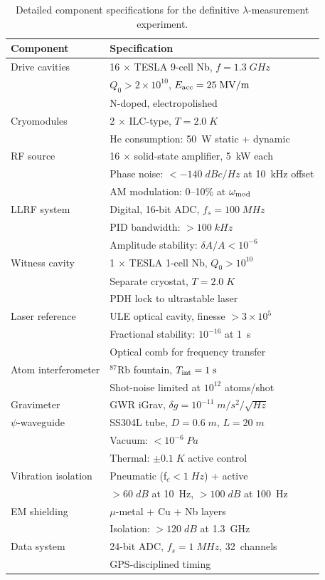 \documentclass[aps,prd,twocolumn,superscriptaddress,floatfix,nofootinbib]{revtex4-2}
\begin{document}
\begin{table}[h]
\caption{Detailed component specifications for the definitive
$\lambda$-measurement experiment.}
\label{tab:components}
\begin{ruledtabular}
\begin{tabular}{ll}
Component & Specification \\
\hline
Drive cavities & 16 $\times$ TESLA 9-cell Nb, $f = 1.3\;\si{GHz}$ \\
 & $Q_0 > 2\times10^{10}$, $E_{\rm acc} = 25\;\si{MV/m}$ \\
 & N-doped, electropolished \\
Cryomodules & 2 $\times$ ILC-type, $T = 2.0\;\si{K}$ \\
 & He consumption: 50~W static + dynamic \\
RF source & 16 $\times$ solid-state amplifier, 5~kW each \\
 & Phase noise: $< -140\;\si{dBc/Hz}$ at 10~kHz offset \\
 & AM modulation: 0--10\% at $\omega_{\rm mod}$ \\
LLRF system & Digital, 16-bit ADC, $f_s = 100\;\si{MHz}$ \\
 & PID bandwidth: $> 100\;\si{kHz}$ \\
 & Amplitude stability: $\delta A/A < 10^{-6}$ \\
Witness cavity & 1 $\times$ TESLA 1-cell Nb, $Q_0 > 10^{10}$ \\
 & Separate cryostat, $T = 2.0\;\si{K}$ \\
 & PDH lock to ultrastable laser \\
Laser reference & ULE optical cavity, finesse $> 3\times10^5$ \\
 & Fractional stability: $10^{-16}$ at 1~s \\
 & Optical comb for frequency transfer \\
Atom interferometer & $^{87}$Rb fountain, $T_{\rm int} = 1\;\si{s}$ \\
 & Shot-noise limited at $10^{12}$ atoms/shot \\
Gravimeter & GWR iGrav, $\delta g = 10^{-11}\;\si{m/s^2/\sqrt{Hz}}$ \\
$\psi$-waveguide & SS304L tube, $D = 0.6\;\si{m}$, $L = 20\;\si{m}$ \\
 & Vacuum: $< 10^{-6}\;\si{Pa}$ \\
 & Thermal: $\pm 0.1\;\si{K}$ active control \\
Vibration isolation & Pneumatic (f$_c < 1\;\si{Hz}$) + active \\
 & $> 60\;\si{dB}$ at 10~Hz, $> 100\;\si{dB}$ at 100~Hz \\
EM shielding & $\mu$-metal + Cu + Nb layers \\
 & Isolation: $> 120\;\si{dB}$ at 1.3~GHz \\
Data system & 24-bit ADC, $f_s = 1\;\si{MHz}$, 32~channels \\
 & GPS-disciplined timing \\
\end{tabular}
\end{ruledtabular}
\end{table}
\end{document}

